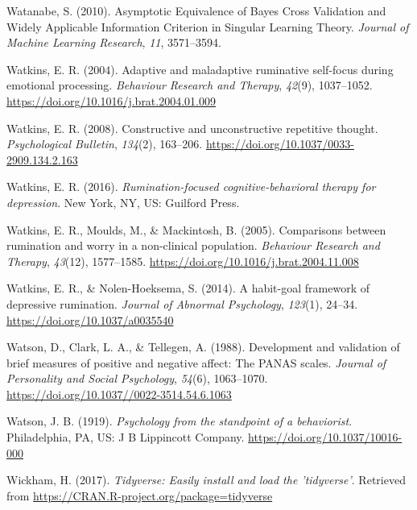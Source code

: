 \documentclass[a4paper,12pt,twoside,openright,oldfontcommands]{memoir}
\begin{document}
\leavevmode\hypertarget{ref-watanabe_asymptotic_2010}{}%
Watanabe, S. (2010). Asymptotic Equivalence of Bayes Cross Validation and Widely Applicable Information Criterion in Singular Learning Theory. \emph{Journal of Machine Learning Research}, \emph{11}, 3571--3594.

\leavevmode\hypertarget{ref-watkins_adaptive_2004}{}%
Watkins, E. R. (2004). Adaptive and maladaptive ruminative self-focus during emotional processing. \emph{Behaviour Research and Therapy}, \emph{42}(9), 1037--1052. \url{https://doi.org/10.1016/j.brat.2004.01.009}

\leavevmode\hypertarget{ref-Watkins2008}{}%
Watkins, E. R. (2008). Constructive and unconstructive repetitive thought. \emph{Psychological Bulletin}, \emph{134}(2), 163--206. \url{https://doi.org/10.1037/0033-2909.134.2.163}

\leavevmode\hypertarget{ref-watkins_rumination-focused_2016}{}%
Watkins, E. R. (2016). \emph{Rumination-focused cognitive-behavioral therapy for depression}. New York, NY, US: Guilford Press.

\leavevmode\hypertarget{ref-watkins_comparisons_2005}{}%
Watkins, E. R., Moulds, M., \& Mackintosh, B. (2005). Comparisons between rumination and worry in a non-clinical population. \emph{Behaviour Research and Therapy}, \emph{43}(12), 1577--1585. \url{https://doi.org/10.1016/j.brat.2004.11.008}

\leavevmode\hypertarget{ref-watkins_habit-goal_2014}{}%
Watkins, E. R., \& Nolen-Hoeksema, S. (2014). A habit-goal framework of depressive rumination. \emph{Journal of Abnormal Psychology}, \emph{123}(1), 24--34. \url{https://doi.org/10.1037/a0035540}

\leavevmode\hypertarget{ref-watson_development_1988}{}%
Watson, D., Clark, L. A., \& Tellegen, A. (1988). Development and validation of brief measures of positive and negative affect: The PANAS scales. \emph{Journal of Personality and Social Psychology}, \emph{54}(6), 1063--1070. \url{https://doi.org/10.1037//0022-3514.54.6.1063}

\leavevmode\hypertarget{ref-watson_psychology_1919}{}%
Watson, J. B. (1919). \emph{Psychology from the standpoint of a behaviorist}. Philadelphia, PA, US: J B Lippincott Company. \url{https://doi.org/10.1037/10016-000}

\leavevmode\hypertarget{ref-R-tidyverse}{}%
Wickham, H. (2017). \emph{Tidyverse: Easily install and load the 'tidyverse'}. Retrieved from \url{https://CRAN.R-project.org/package=tidyverse}
\end{document}
